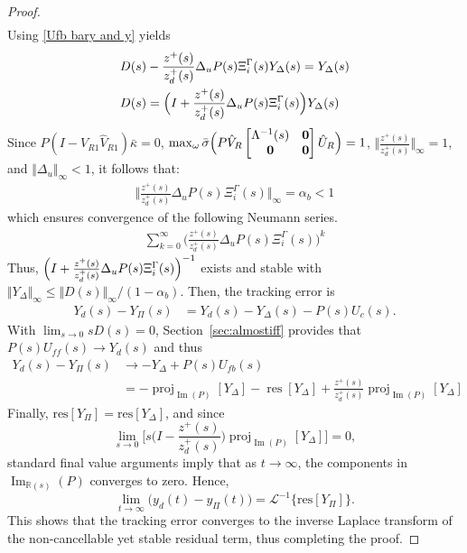 \documentclass[journal]{IEEEtran}
\theoremstyle{remark}
\DeclareMathOperator*{\im}{Im}
\DeclareMathOperator*{\proj}{proj}
\DeclareMathOperator*{\res}{res}
\begin{document}
\begin{proof}
\begin{align*}
\end{align*}
Using \eqref{Ufb bary and y} yields
\begin{align*}
    &D(s)-\frac{z^+(s)}{z_d^+(s)}\Delta_uP(s)\Xi_i^\Gamma(s)Y_\Delta(s) = Y_\Delta(s)\\
    &D(s) =\Bigl( I+ \frac{z^+(s)}{z_d^+(s)}\Delta_uP(s)\Xi_i^\Gamma(s) \Bigr)Y_\Delta(s)
\end{align*}
Since \small$P(I-V_{R1}\hat{V}_{R1})\bar{\kappa} = 0$,  $\max_\omega\bar{\sigma} \Bigl( P\hat{V}_R \begin{bmatrix}
    \Lambda^{-1}(s) & \textbf{0}\\
    \textbf{0} & \textbf{0}
\end{bmatrix}\hat{U}_R \Bigr)=1$\normalsize, $\biggl\Vert \frac{z^+(s)}{z_d^+(s)} \biggr\Vert_\infty =1$, and $\Vert \Delta_u\Vert_\infty <1$, it follows that:
\begin{align*}
\biggl\Vert \frac{z^+(s)}{z_d^+(s)}\Delta_uP(s)\Xi_i^\Gamma(s)\biggr\Vert_\infty= \alpha_b <1
\end{align*}
which ensures convergence of the following Neumann series.
\begin{align}
    \sum_{k=0}^\infty \biggl( \frac{z^+(s)}{z_d^+(s)}\Delta_uP(s)\Xi_i^\Gamma(s)\biggr)^k 
\end{align}
Thus, $\Bigl( I+ \frac{z^+(s)}{z_d^+(s)}\Delta_uP(s)\Xi_i^\Gamma(s)\Bigr)^{-1}$ exists and stable with
$\Vert Y_\Delta \Vert_\infty \leq {\Vert D(s)\Vert_\infty}/{\left( 1-\alpha_b\right) }$.
Then, the tracking error is
\begin{align*}
    Y_d(s)-Y_\Pi(s)&=Y_d(s)-Y_\Delta(s) - P(s)U_{c}(s). 
\end{align*}
With $\lim_{s \to 0}sD(s)=0$, Section~\ref{sec:almostiff} provides that $P(s)U_{ff}(s) \to Y_d(s)$ and thus
\begin{align*}
      Y_d(s)-Y_\Pi(s) &\to -Y_\Delta + P(s)U_{fb}(s) \\
   &= -\proj_{\im(P)}[Y_\Delta] - \res[Y_\Delta] + \frac{z^+(s)}{z_d^+(s)}\proj_{\im(P)}[Y_\Delta]
\end{align*}
Finally, 
$\mathrm{res}[Y_\Pi] = \mathrm{res}[Y_\Delta]$, and since \[\lim_{s \to 0} \biggl[ s \biggl(I - \frac{z^+(s)}{z_d^+(s)}\biggr) \proj_{\im(P)}[Y_\Delta] \biggr] = 0,\] standard final value arguments imply that as \(t \to \infty\), the components in \(\im_{\mathbb{R}(s)}(P)\) converges to zero. Hence,
\[
\lim_{t \to \infty} \bigl( y_d(t) - y_\Pi(t) \bigr) = \mathcal{L}^{-1}\bigl\{\mathrm{res}[Y_\Pi]\bigr\}.
\]
This shows that the tracking error converges to the inverse Laplace transform of the non-cancellable yet stable residual term, thus completing the proof.
\end{proof}
\end{document}
